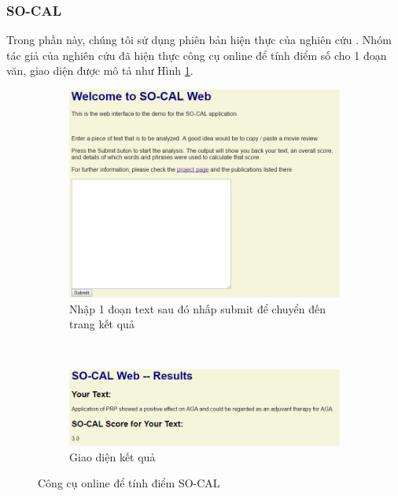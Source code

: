 \subsubsection*{SO-CAL}
Trong phần này, chúng tôi sử dụng phiên bản hiện thực của nghiên cứu \cite{taboada2011lexicon}. Nhóm tác giả của nghiên cứu \cite{taboada2011lexicon} đã hiện thực công cụ online để tính điểm số cho 1 đoạn văn, giao diện được mô tả như Hình \ref{fig:socal}.
\begin{figure}[H]
\centering
\begin{subfigure}[b]{0.4\textwidth}
\includegraphics[scale=0.3]{../hinh/socal.png}
\caption{Nhập 1 đoạn text sau đó nhấp submit để chuyển đến trang kết quả}
\end{subfigure}
~
\begin{subfigure}[b]{0.4\textwidth}
\includegraphics[scale=0.3]{../hinh/socal_result.png}
 \caption{Giao diện kết quả}
\end{subfigure}
\caption{Công cụ online để tính điểm SO-CAL} \label{fig:socal}
\end{figure}

